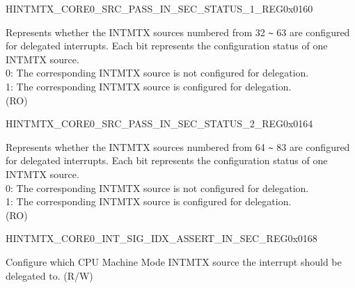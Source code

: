 \begin{register}{H}{INTMTX\_CORE0\_SRC\_PASS\_IN\_SEC\_STATUS\_1\_REG}{0x0160}\label{regdesc:INTMTXCORE0SRCPASSINSECSTATUS1REG}
%
\regnewline%
\begin{regdesc}\begin{reglist}
\label{fielddesc:INTMTXCORE0INTSRCPASSINSECSTATUS1}\item [INTMTX\_CORE0\_INT\_SRC\_PASS\_IN\_SEC\_STATUS\_1] Represents whether the INTMTX sources numbered from 32 \verb+~+ 63 are configured for delegated interrupts. Each bit represents the configuration status of one INTMTX source.\\

0: The corresponding INTMTX source is not configured for delegation.\\
1: The corresponding INTMTX source is configured for delegation.\\ (RO)
\end{reglist}\end{regdesc}
\end{register}


\begin{register}{H}{INTMTX\_CORE0\_SRC\_PASS\_IN\_SEC\_STATUS\_2\_REG}{0x0164}\label{regdesc:INTMTXCORE0SRCPASSINSECSTATUS2REG}
%
%
\regnewline%
\begin{regdesc}\begin{reglist}
\label{fielddesc:INTMTXCORE0INTSRCPASSINSECSTATUS2}\item [INTMTX\_CORE0\_INT\_SRC\_PASS\_IN\_SEC\_STATUS\_2] Represents whether the INTMTX sources numbered from 64 \verb+~+ 83 are configured for delegated interrupts. Each bit represents the configuration status of one INTMTX source.\\

0: The corresponding INTMTX source is not configured for delegation.\\
1: The corresponding INTMTX source is configured for delegation.\\ (RO)
\end{reglist}\end{regdesc}
\end{register}


\begin{register}{H}{INTMTX\_CORE0\_INT\_SIG\_IDX\_ASSERT\_IN\_SEC\_REG}{0x0168}\label{regdesc:INTMTXCORE0INTSIGIDXASSERTINSECREG}
%
%
\regnewline%
\begin{regdesc}\begin{reglist}
\label{fielddesc:INTMTXCORE0INTSIGIDXASSERTINSEC}\item [INTMTX\_CORE0\_INT\_SIG\_IDX\_ASSERT\_IN\_SEC] Configure which CPU Machine Mode INTMTX source the interrupt should be delegated to. (R/W)
\end{reglist}\end{regdesc}
\end{register}



